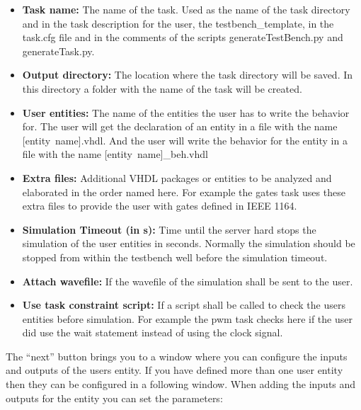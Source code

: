 \begin{itemize}
\item {\bf Task name:} The name of the task. Used as the name of the task directory and in the task description for the user, the testbench\_template, in the task.cfg file and in the comments of the scripts generateTestBench.py and generateTask.py.
\item {\bf Output directory:} The location where the task directory will be saved. In this directory a folder with the name of the task will be created.
\item {\bf User entities:} The name of the entities the user has to write the behavior for. The user will get the declaration of an entity in a file with the name \mbox{[entity name].vhdl}. And the user will write the behavior for the entity in a file with the name \mbox{[entity name]\_beh.vhdl}
\item {\bf Extra files:} Additional VHDL packages or entities to be analyzed and elaborated in the order named here. For example the gates task uses these extra files to provide the user with gates defined in IEEE 1164.
\item {\bf Simulation Timeout (in s): } Time until the server hard stops the simulation of the user entities in seconds. Normally the simulation should be stopped from within the testbench well before the simulation timeout.
\item {\bf Attach wavefile:} If the wavefile of the simulation shall be sent to the user.
\item {\bf Use task constraint script:} If a script shall be called to check the users entities before simulation. For example the pwm task checks here if the user did use the wait statement instead of using the clock signal.
\end{itemize}

The ``next'' button brings you to a window where you can configure the inputs and outputs of the users entity. If you have defined more than one user entity then they can be configured in a following window. When adding the inputs and outputs for the entity you can set the parameters:

